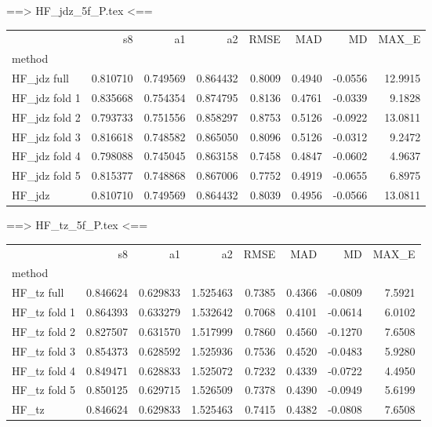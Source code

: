 ==> HF_jdz_5f_P.tex <==
\begin{tabular}{lrrrrrrr}
 & s8 & a1 & a2 & RMSE & MAD & MD & MAX_E \\
method &  &  &  &  &  &  &  \\
HF_jdz full & 0.810710 & 0.749569 & 0.864432 & 0.8009 & 0.4940 & -0.0556 & 12.9915 \\
HF_jdz fold 1 & 0.835668 & 0.754354 & 0.874795 & 0.8136 & 0.4761 & -0.0339 & 9.1828 \\
HF_jdz fold 2 & 0.793733 & 0.751556 & 0.858297 & 0.8753 & 0.5126 & -0.0922 & 13.0811 \\
HF_jdz fold 3 & 0.816618 & 0.748582 & 0.865050 & 0.8096 & 0.5126 & -0.0312 & 9.2472 \\
HF_jdz fold 4 & 0.798088 & 0.745045 & 0.863158 & 0.7458 & 0.4847 & -0.0602 & 4.9637 \\
HF_jdz fold 5 & 0.815377 & 0.748868 & 0.867006 & 0.7752 & 0.4919 & -0.0655 & 6.8975 \\
HF_jdz & 0.810710 & 0.749569 & 0.864432 & 0.8039 & 0.4956 & -0.0566 & 13.0811 \\
\end{tabular}

==> HF_tz_5f_P.tex <==
\begin{tabular}{lrrrrrrr}
 & s8 & a1 & a2 & RMSE & MAD & MD & MAX_E \\
method &  &  &  &  &  &  &  \\
HF_tz full & 0.846624 & 0.629833 & 1.525463 & 0.7385 & 0.4366 & -0.0809 & 7.5921 \\
HF_tz fold 1 & 0.864393 & 0.633279 & 1.532642 & 0.7068 & 0.4101 & -0.0614 & 6.0102 \\
HF_tz fold 2 & 0.827507 & 0.631570 & 1.517999 & 0.7860 & 0.4560 & -0.1270 & 7.6508 \\
HF_tz fold 3 & 0.854373 & 0.628592 & 1.525936 & 0.7536 & 0.4520 & -0.0483 & 5.9280 \\
HF_tz fold 4 & 0.849471 & 0.628833 & 1.525072 & 0.7232 & 0.4339 & -0.0722 & 4.4950 \\
HF_tz fold 5 & 0.850125 & 0.629715 & 1.526509 & 0.7378 & 0.4390 & -0.0949 & 5.6199 \\
HF_tz & 0.846624 & 0.629833 & 1.525463 & 0.7415 & 0.4382 & -0.0808 & 7.6508 \\
\end{tabular}
